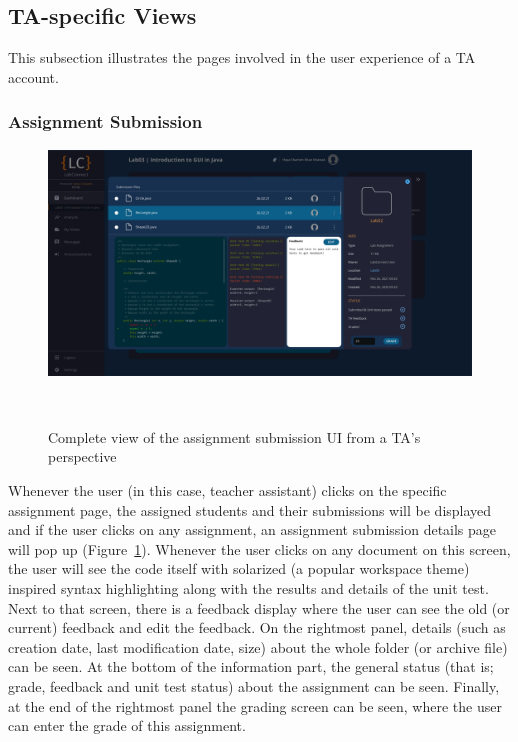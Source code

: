 \documentclass[a4paper, 12pt]{article}
\begin{document}
    \pagebreak
    
    
    \subsection{TA-specific Views}
    
    This subsection illustrates the pages involved in the user experience of a TA account.
    
    \subsubsection{Assignment Submission}
    
    \begin{figure}[H]
        \centering
        \includegraphics[width=\textwidth]{ta_assignment_submission}
        \caption{Complete view of the assignment submission UI from a TA's perspective}~\label{fig:ta_assignment_submission_full}
    \end{figure}
    
    Whenever the user (in this case, teacher assistant) clicks on the specific assignment page, the assigned students and their submissions will be displayed and if the user clicks on any assignment,
    an assignment submission details page will pop up (Figure~\ref{fig:ta_assignment_submission_full}). Whenever the user clicks on any document on this screen, the user will see the code itself with
    solarized (a popular workspace theme) inspired syntax highlighting along with the results and details of the unit test. Next to that screen, there is a feedback display where the user can see the old 
    (or current) feedback and edit the feedback. On the rightmost panel, details (such as creation date, last modification date, size) about the whole folder 
    (or archive file) can be seen. At the bottom of the information part, the general status (that is; grade, feedback and unit test status) about the assignment can be seen. 
    Finally, at the end of the rightmost panel the grading screen can be seen, where the user can enter the grade of this assignment. 
    
\end{document}
